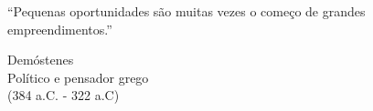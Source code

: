 \epigraph{``Pequenas oportunidades são muitas vezes o começo de grandes empreendimentos.''}{Demóstenes\\Político e pensador grego\\(384 a.C. - 322 a.C)}
